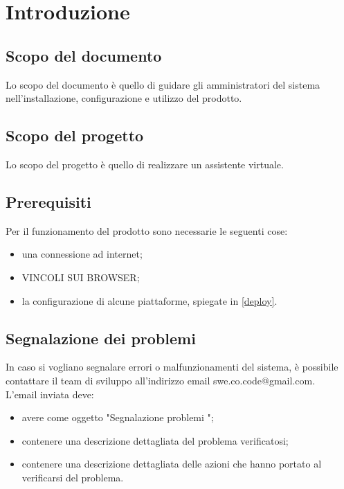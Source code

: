 \section{Introduzione}
\subsection{Scopo del documento}
Lo scopo del documento è quello di guidare gli amministratori del sistema nell'installazione, configurazione e utilizzo del prodotto.
\subsection{Scopo del progetto}
Lo scopo del progetto è quello di realizzare un assistente virtuale.
\subsection{Prerequisiti}
Per il funzionamento del prodotto sono necessarie le seguenti cose:
\begin{itemize}
	\item una connessione ad internet;
	\item VINCOLI SUI BROWSER;
	\item la configurazione di alcune piattaforme, spiegate in \ref{deploy}.
\end{itemize}
\subsection{Segnalazione dei problemi}
In caso si vogliano segnalare errori o malfunzionamenti del sistema, è possibile contattare il team di sviluppo \GRUPPO{} all'indirizzo email swe.co.code@gmail.com. \\
L'email inviata deve:
\begin{itemize}
	\item avere come oggetto "Segnalazione problemi \PROGETTO";
	\item contenere una descrizione dettagliata del problema verificatosi;
	\item contenere una descrizione dettagliata delle azioni che hanno portato al verificarsi del problema.
\end{itemize}